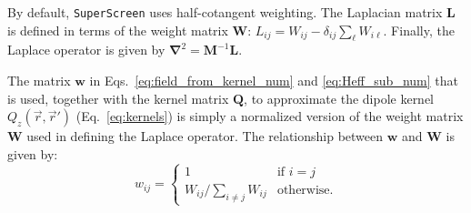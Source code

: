 \documentclass[final,3p,times]{elsarticle}
\newcommand{\inline}[1]{\texttt{#1}\xspace}
\newcommand{\SuperScreen}{\inline{SuperScreen}}
\newcounter{bla}
\begin{document}
By default, \SuperScreen uses half-cotangent weighting. The Laplacian matrix $\mathbf{L}$ is defined in terms of the weight matrix $\mathbf{W}$: $L_{ij} = W_{ij} - \delta_{ij}\sum_{\ell}W_{i\ell}$. Finally, the Laplace operator is given by $\mathbf{\nabla}^2 = \mathbf{M}^{-1}\mathbf{L}$.

The matrix $\mathbf{w}$ in Eqs.~\ref{eq:field_from_kernel_num} and \ref{eq:Heff_sub_num} that is used, together with the kernel matrix $\mathbf{Q}$, to approximate the dipole kernel $Q_z(\vec{r},\vec{r}')$ (Eq.~\ref{eq:kernels}) is simply a normalized version of the weight matrix $\mathbf{W}$ used in defining the Laplace operator. The relationship between $\mathbf{w}$ and $\mathbf{W}$ is given by:
$$
    w_{ij} = \begin{cases}
        1&\text{if }i = j\\
        W_{ij} / \sum_{i\neq j} W_{ij}&\text{otherwise.}
    \end{cases}
$$


\end{document}
